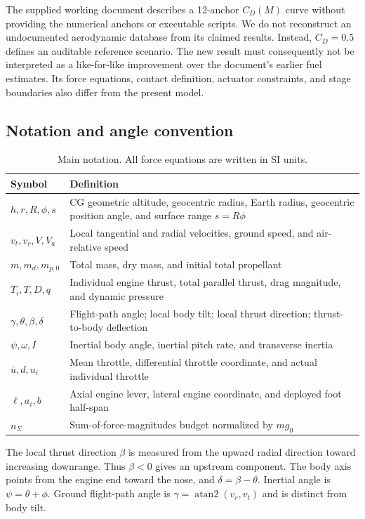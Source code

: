 \documentclass[11pt,a4paper]{article}
\begin{document}
The supplied working document describes a 12-anchor $C_D(M)$ curve without providing the numerical anchors or executable scripts. We do not reconstruct an undocumented aerodynamic database from its claimed results. Instead, $C_D=0.5$ defines an auditable reference scenario. The new result must consequently not be interpreted as a like-for-like improvement over the document's earlier fuel estimates. Its force equations, contact definition, actuator constraints, and stage boundaries also differ from the present model.

\subsection{Notation and angle convention}
\begin{table}[htbp]
\caption{Main notation. All force equations are written in SI units.}
\label{tab:notation}
\small
\begin{tabularx}{\linewidth}{@{}lX@{}}
\toprule
Symbol & Definition\\
\midrule
$h,r,R,\phi,s$ & CG geometric altitude, geocentric radius, Earth radius, geocentric position angle, and surface range $s=R\phi$\\
$v_t,v_r,V,V_a$ & Local tangential and radial velocities, ground speed, and air-relative speed\\
$m,m_d,m_{p,0}$ & Total mass, dry mass, and initial total propellant\\
$T_i,T,D,q$ & Individual engine thrust, total parallel thrust, drag magnitude, and dynamic pressure\\
$\gamma,\theta,\beta,\delta$ & Flight-path angle; local body tilt; local thrust direction; thrust-to-body deflection\\
$\psi,\omega,I$ & Inertial body angle, inertial pitch rate, and transverse inertia\\
$\bar u,d,u_i$ & Mean throttle, differential throttle coordinate, and actual individual throttle\\
$\ell,a_i,b$ & Axial engine lever, lateral engine coordinate, and deployed foot half-span\\
$n_\Sigma$ & Sum-of-force-magnitudes budget normalized by $mg_0$\\
\bottomrule
\end{tabularx}
\end{table}

The local thrust direction $\beta$ is measured from the upward radial direction toward increasing downrange. Thus $\beta<0$ gives an upstream component. The body axis points from the engine end toward the nose, and $\delta=\beta-\theta$. Inertial angle is $\psi=\theta+\phi$. Ground flight-path angle is $\gamma=\operatorname{atan2}(v_r,v_t)$ and is distinct from body tilt.
\end{document}
